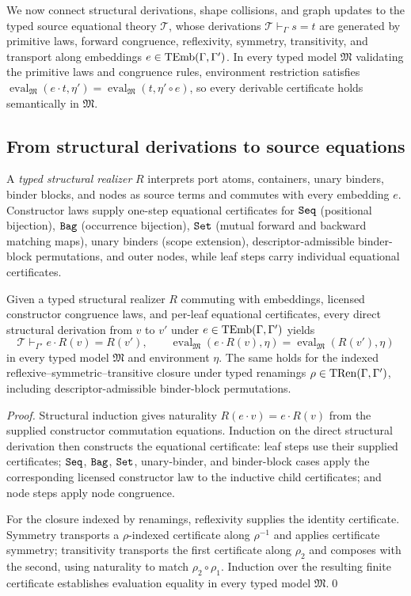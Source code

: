 We now connect structural derivations, shape collisions, and graph updates to
the typed source equational theory $\mathcal T$, whose derivations
$\mathcal T\vdash_\Gamma s=t$ are generated by primitive laws, forward
congruence, reflexivity, symmetry, transitivity, and transport along embeddings
$e\in\operatorname{TEmb}(\Gamma,\Gamma')$. In every typed model $\mathfrak M$ validating the
primitive laws and congruence rules, environment restriction satisfies
$\operatorname{eval}_{\mathfrak M}(e\cdot t,\eta')
=\operatorname{eval}_{\mathfrak M}(t,\eta'\circ e)$, so every derivable
certificate holds semantically in $\mathfrak M$.

\subsection{From structural derivations to source equations}

A \emph{typed structural realizer} $R$ interprets port atoms, containers,
unary binders, binder blocks, and nodes as source terms and commutes with every
embedding $e$. Constructor laws supply one-step equational certificates for
$\texttt{Seq}$ (positional bijection), $\texttt{Bag}$ (occurrence bijection), $\texttt{Set}$ (mutual
forward and backward matching maps), unary binders (scope extension),
descriptor-admissible binder-block permutations, and outer nodes, while leaf
steps carry individual equational certificates.

\begin{proposition}
\label{thm:structural-soundness}
Given a typed structural realizer $R$ commuting with embeddings, licensed
constructor congruence laws, and per-leaf equational certificates, every direct
structural derivation from $v$ to $v'$ under $e\in\operatorname{TEmb}(\Gamma,\Gamma')$ yields
\[
 \mathcal T\vdash_{\Gamma'} e\cdot R(v)=R(v'),
 \qquad
 \operatorname{eval}_{\mathfrak M}(e\cdot R(v),\eta)
 =\operatorname{eval}_{\mathfrak M}(R(v'),\eta)
\]
in every typed model $\mathfrak M$ and environment $\eta$. The same holds for
the indexed reflexive--symmetric--transitive closure under typed renamings
$\rho\in\operatorname{TRen}(\Gamma,\Gamma')$, including descriptor-admissible binder-block
permutations.
\end{proposition}
\begin{proof}
Structural induction gives naturality $R(e\cdot v)=e\cdot R(v)$ from the
supplied constructor commutation equations. Induction on the direct structural
derivation then constructs the equational certificate: leaf steps use their
supplied certificates; $\texttt{Seq}$, $\texttt{Bag}$, $\texttt{Set}$, unary-binder, and binder-block
cases apply the corresponding licensed constructor law to the inductive child
certificates; and node steps apply node congruence.

For the closure indexed by renamings, reflexivity supplies the identity
certificate. Symmetry transports a $\rho$-indexed certificate along $\rho^{-1}$
and applies certificate symmetry; transitivity transports the first certificate
along $\rho_2$ and composes with the second, using naturality to match
$\rho_2\circ\rho_1$. Induction over the resulting finite certificate establishes
evaluation equality in every typed model $\mathfrak M$.\qed
\end{proof}

